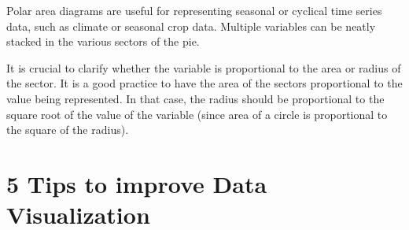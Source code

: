 \documentclass[]{book}
\theoremstyle{definition}
\theoremstyle{definition}
\theoremstyle{definition}
\theoremstyle{remark}
\begin{document}
Polar area diagrams are useful for representing seasonal or cyclical
time series data, such as climate or seasonal crop data. Multiple
variables can be neatly stacked in the various sectors of the pie.

It is crucial to clarify whether the variable is proportional to the
area or radius of the sector. It is a good practice to have the area of
the sectors proportional to the value being represented. In that case,
the radius should be proportional to the square root of the value of the
variable (since area of a circle is proportional to the square of the
radius).

\section{5 Tips to improve Data
Visualization}\label{tips-to-improve-data-visualization}
\end{document}
